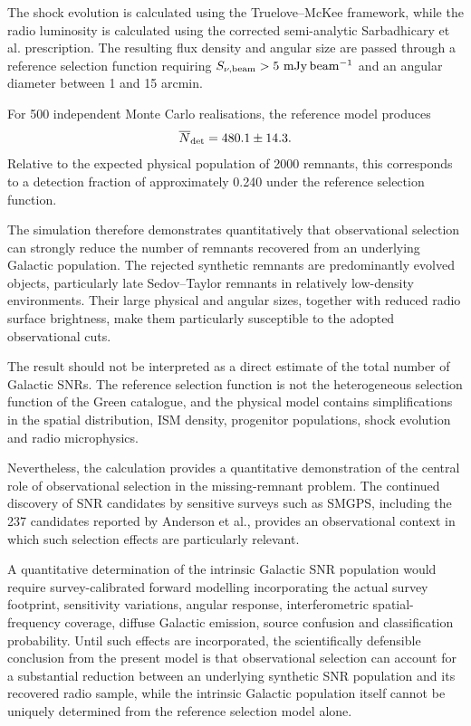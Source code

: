 \documentclass[
aps,
prd,
reprint,
superscriptaddress,
nofootinbib
]{revtex4-2}
\begin{document}
	The shock evolution is calculated using the Truelove--McKee framework, while
	the radio luminosity is calculated using the corrected semi-analytic
	Sarbadhicary et al. prescription.  The resulting flux density and angular
	size are passed through a reference selection function requiring
	$S_{\nu,\rm beam}>5~\mathrm{mJy\,beam^{-1}}$ and an angular diameter between
	1 and 15 arcmin.
	
	For 500 independent Monte Carlo realisations, the reference model produces
	\begin{equation}
		\overline{N}_{\rm det}=480.1\pm14.3.
	\end{equation}
	Relative to the expected physical population of 2000 remnants, this
	corresponds to a detection fraction of approximately 0.240 under the
	reference selection function.
	
	The simulation therefore demonstrates quantitatively that observational
	selection can strongly reduce the number of remnants recovered from an
	underlying Galactic population.  The rejected synthetic remnants are
	predominantly evolved objects, particularly late Sedov--Taylor remnants in
	relatively low-density environments.  Their large physical and angular sizes,
	together with reduced radio surface brightness, make them particularly
	susceptible to the adopted observational cuts.
	
	The result should not be interpreted as a direct estimate of the total number
	of Galactic SNRs.  The reference selection function is not the heterogeneous
	selection function of the Green catalogue, and the physical model contains
	simplifications in the spatial distribution, ISM density, progenitor
	populations, shock evolution and radio microphysics.
	
	Nevertheless, the calculation provides a quantitative demonstration of the
	central role of observational selection in the missing-remnant problem.  The
	continued discovery of SNR candidates by sensitive surveys such as SMGPS,
	including the 237 candidates reported by Anderson et al., provides an
	observational context in which such selection effects are particularly
	relevant.
	
	A quantitative determination of the intrinsic Galactic SNR population would
	require survey-calibrated forward modelling incorporating the actual survey
	footprint, sensitivity variations, angular response, interferometric
	spatial-frequency coverage, diffuse Galactic emission, source confusion and
	classification probability.  Until such effects are incorporated, the
	scientifically defensible conclusion from the present model is that
	observational selection can account for a substantial reduction between an
	underlying synthetic SNR population and its recovered radio sample, while the
	intrinsic Galactic population itself cannot be uniquely determined from the
	reference selection model alone.
	
\end{document}
